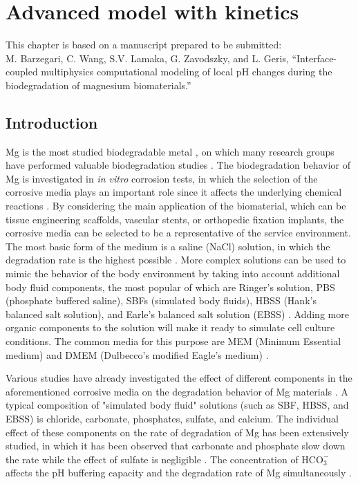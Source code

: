 \chapter{Advanced model with kinetics}\label{ch:kinetics}


\begin{shaded}
This chapter is based on a manuscript prepared to be submitted:\\
M. Barzegari, C. Wang, S.V. Lamaka, G. Zavodszky, and L. Geris, ``Interface-coupled multiphysics computational modeling of local pH changes during the biodegradation of magnesium biomaterials.''
\end{shaded}

\section{Introduction}

Mg is the most studied biodegradable metal \cite{Liu2019,Zheng2014,Chen2014,Zhang2013}, on which many research groups have performed valuable biodegradation studies \cite{Esmaily2017,Li2016,Atrens2020,Kirkland2012}. The biodegradation behavior of Mg is investigated in \textit{in vitro} corrosion tests, in which the selection of the corrosive media plays an important role since it affects the underlying chemical reactions \cite{Mei2020}. By considering the main application of the biomaterial, which can be tissue engineering scaffolds, vascular stents, or orthopedic fixation implants, the corrosive media can be selected to be a representative of the service environment. The most basic form of the medium is a saline (NaCl) solution, in which the degradation rate is the highest possible \cite{Mei2020}. More complex solutions can be used to mimic the behavior of the body environment by taking into account additional body fluid components, the most popular of which are Ringer's solution, \gls{PBS} (phosphate buffered saline), \gls{SBF}s (simulated body fluids), \gls{HBSS} (Hank's balanced salt solution), and Earle's balanced salt solution (\gls{EBSS}) \cite{Mei2020}. Adding more organic components to the solution will make it ready to simulate cell culture conditions. The common media for this purpose are \gls{MEM} (Minimum Essential medium) and \gls{DMEM} (Dulbecco's modified Eagle's medium) \cite{Mei2020}.

Various studies have already investigated the effect of different components in the aforementioned corrosive media on the degradation behavior of Mg materials \cite{Mei2019,Zeng2014,Johnston2017, Lamaka2018,Mei2019a}. A typical composition of "simulated body fluid" solutions (such as \gls{SBF}, \gls{HBSS}, and \gls{EBSS}) is chloride, carbonate, phosphates, sulfate, and calcium. The individual effect of these components on the rate of degradation of Mg has been extensively studied, in which it has been observed that carbonate and phosphate slow down the rate while the effect of sulfate is negligible \cite{Johnston2017,Mei2019a}. The concentration of $\mathrm{HCO}_{3}^{-}$ affects the pH buffering capacity and the degradation rate of Mg simultaneously \cite{Xin2011}.

